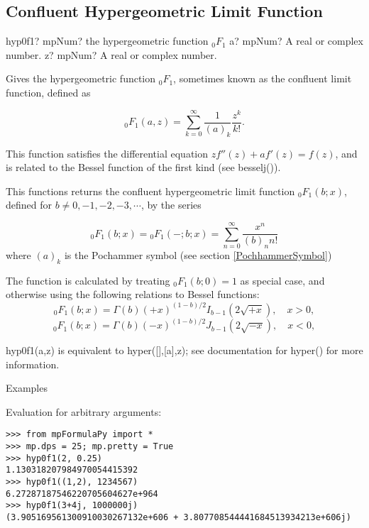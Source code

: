 \subsection{Confluent Hypergeometric Limit Function}

\begin{mpFunctionsExtract}
	\mpFunctionTwo
	{hyp0f1? mpNum? the hypergeometric function ${}_0F_1$}
	{a? mpNum? A real or complex number.}
	{z? mpNum? A real or complex number.}	
\end{mpFunctionsExtract}

\vpara
Gives the hypergeometric function ${}_0F_1$, sometimes known as the confluent limit function, defined as

\begin{equation}
{}_0F_1(a,z) = \sum_{k=0}^{\infty} \frac{1}{(a)_k} \frac{z^k}{k!}.
\end{equation}

This function satisfies the differential equation $z f''(z) + a f'(z) = f(z)$, and is related to the Bessel function of the first kind (see besselj()). 

\vspace{0.3cm}
This functions returns the confluent hypergeometric limit function ${}_0F_1(b; x)$, defined for $b \neq 0,-1,-2,-3, \cdots$,  by the series 

\begin{equation}
{}_0F_1(b;x) = {}_0F_1(-;b;x) = \sum_{n=0}^\infty \frac{x^n}{(b)_n n!}
\end{equation}
where $(a)_k$ is the Pochammer symbol (see section \ref{PochhammerSymbol})

The function is calculated by treating ${}_0F_1(b;0) = 1$ as special case, and otherwise using the following relations to Bessel functions:
\begin{equation}
{}_0F_1(b;x) = \Gamma(b) (+x)^{(1-b)/2} I_{b-1}\left(2\sqrt{+x}\right), \quad x>0,
\end{equation}
\begin{equation}
{}_0F_1(b;x) = \Gamma(b) (-x)^{(1-b)/2} J_{b-1}\left(2\sqrt{-x}\right), \quad x<0,
\end{equation}


\vpara
hyp0f1(a,z) is equivalent to hyper([],[a],z); see documentation for hyper() for more information.

Examples

Evaluation for arbitrary arguments:

\begin{lstlisting}
>>> from mpFormulaPy import *
>>> mp.dps = 25; mp.pretty = True
>>> hyp0f1(2, 0.25)
1.130318207984970054415392
>>> hyp0f1((1,2), 1234567)
6.27287187546220705604627e+964
>>> hyp0f1(3+4j, 1000000j)
(3.905169561300910030267132e+606 + 3.807708544441684513934213e+606j)
\end{lstlisting}

